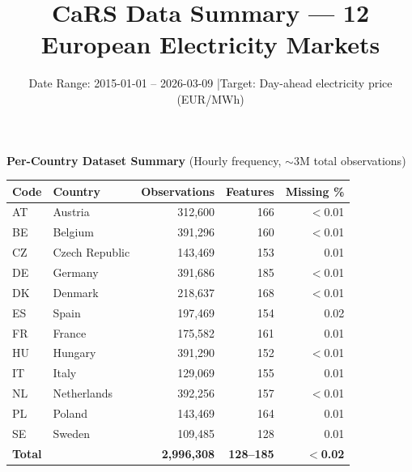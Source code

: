 \documentclass[11pt,a4paper]{article}
\title{CaRS Data Summary --- 12 European Electricity Markets}
\author{}
\date{Date Range: 2015-01-01 -- 2026-03-09 \quad|\quad Target: Day-ahead electricity price (EUR/MWh)}
\begin{document}
\maketitle

\vspace{-0.3cm}

\begin{center}
\textbf{Per-Country Dataset Summary} (Hourly frequency, $\sim$3M total observations)
\vspace{0.1cm}

\small
\begin{tabular}{ll r r r}
\toprule
\textbf{Code} & \textbf{Country} & \textbf{Observations} & \textbf{Features} & \textbf{Missing \%} \\
\midrule
AT & Austria        & 312,600  & 166 & $<$0.01 \\
BE & Belgium        & 391,296  & 160 & $<$0.01 \\
CZ & Czech Republic & 143,469  & 153 & 0.01 \\
DE & Germany        & 391,686  & 185 & $<$0.01 \\
DK & Denmark        & 218,637  & 168 & $<$0.01 \\
ES & Spain          & 197,469  & 154 & 0.02 \\
FR & France         & 175,582  & 161 & 0.01 \\
HU & Hungary        & 391,290  & 152 & $<$0.01 \\
IT & Italy          & 129,069  & 155 & 0.01 \\
NL & Netherlands    & 392,256  & 157 & $<$0.01 \\
PL & Poland         & 143,469  & 164 & 0.01 \\
SE & Sweden         & 109,485  & 128 & 0.01 \\
\midrule
\multicolumn{2}{l}{\textbf{Total}} & \textbf{2,996,308} & \textbf{128--185} & $<$\textbf{0.02} \\
\bottomrule
\end{tabular}
\end{center}

\vspace{0.1cm}
\end{document}
